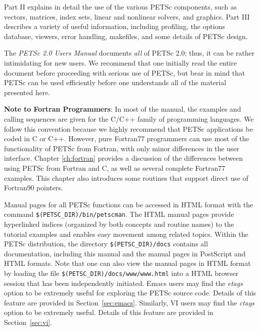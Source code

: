 Part II explains in detail the use of the various PETSc components,
such as vectors, matrices, index sets, linear and nonlinear
solvers, and graphics.  Part III describes a variety of useful
information, including profiling, the options database, viewers, error
handling, makefiles, and some details of
PETSc design.

\nocite{efficient}

The {\em PETSc 2.0 Users Manual} documents {\em all} of PETSc 2.0; thus,
it can be rather intimidating for new users. We recommend that one initially
read the entire document before proceeding with serious use of PETSc,
but bear in mind that PETSc can be used efficiently
before one understands all of the material presented here. 

\medskip \medskip

{\bf Note to Fortran Programmers}: In most of the  
manual, the examples and calling sequences are given for the C/C++
family of programming languages.  We follow this convention because we
highly recommend that PETSc applications be coded in C or C++.
However, pure Fortran77 programmers can use most of the
functionality of PETSc from Fortran, with only minor differences in
the user interface.  Chapter \ref{ch:fortran} provides a discussion of the
differences between using PETSc from Fortran and C, as well as several
complete Fortran77 examples.  This chapter also introduces some
routines that support direct use of Fortran90 pointers.

\medskip \medskip

Manual pages for all PETSc functions can be
accessed in HTML format with the command {\tt \$(PETSC\_DIR)\-/bin\-/petscman}.
The HTML manual pages
provide hyperlinked indices (organized by
both concepts and routine names) to the tutorial examples and enables
easy movement among related topics.  Within the PETSc distribution, the directory
{\tt \$(PETSC\_DIR)/docs} contains all documentation, including this
manual and the manual pages in PostScript and HTML
formats. Note that one can also view the manual pages in HTML format
by loading the file {\tt \$(PETSC\_DIR)/docs/www/www.html}
into a HTML browser session that has been independently initiated.
Emacs users may find the
{\em etags} option to be extremely useful for exploring the PETSc
source code.  Details of this feature are provided in
Section~\ref{sec:emacs}. Similarly, VI users may find the
{\em ctags} option to be extremely useful. Details of this 
feature are provided in Section~\ref{sec:vi}.

